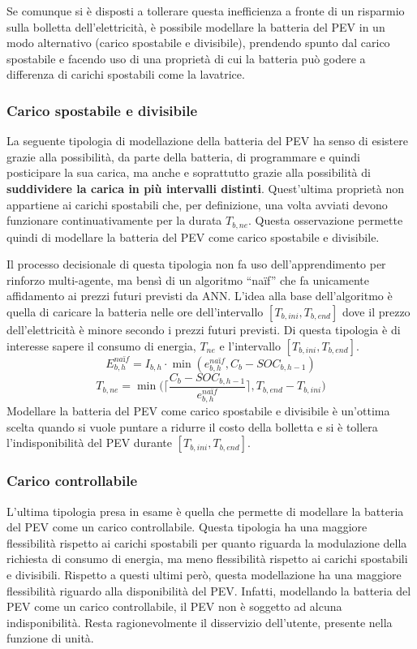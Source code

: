 \documentclass[italian, Lau, oneside]{sapthesis}
\begin{document}
Se comunque si è disposti a tollerare questa inefficienza a fronte di un risparmio sulla bolletta dell'elettricità, è possibile modellare la batteria del PEV in un modo alternativo (carico spostabile e divisibile), prendendo spunto dal carico spostabile e facendo uso di una proprietà di cui la batteria può godere a differenza di carichi spostabili come la lavatrice.

\subsubsection{Carico spostabile e divisibile}
La seguente tipologia di modellazione della batteria del PEV ha senso di esistere grazie alla possibilità, da parte della batteria, di programmare e quindi posticipare la sua carica, ma anche e soprattutto grazie alla possibilità di \textbf{suddividere la carica in più intervalli distinti}. Quest'ultima proprietà non appartiene ai carichi spostabili che, per definizione, una volta avviati devono funzionare continuativamente per la durata $T_{b,ne}$. Questa osservazione permette quindi di modellare la batteria del PEV come carico spostabile e divisibile.

Il processo decisionale di questa tipologia non fa uso dell'apprendimento per rinforzo multi-agente, ma bensì di un algoritmo “naïf” che fa unicamente affidamento ai prezzi futuri previsti da ANN. L'idea alla base dell'algoritmo è quella di caricare la batteria nelle ore dell'intervallo $[T_{b,ini}, T_{b,end}]$ dove il prezzo dell'elettricità è minore secondo i prezzi futuri previsti. Di questa tipologia è di interesse sapere il consumo di energia, $T_{ne}$ e l'intervallo $[T_{b,ini}, T_{b,end}]$.
\begin{equation}
E^{naïf}_{b,h} = I_{b,h} \cdot \min(e^{naïf}_{b,h}, C_b - SOC_{b,h-1})
\end{equation}
\begin{equation}
    T_{b,ne} = \min \Bigg( \Bigg \lceil \frac{C_b - SOC_{b,h-1}}{e^{naïf}_{b,h}} \Bigg \rceil, T_{b,end}-T_{b,ini} \Bigg)
\end{equation}
Modellare la batteria del PEV come carico spostabile e divisibile è un'ottima scelta quando si vuole puntare a ridurre il costo della bolletta e si è tollera l'indisponibilità del PEV durante $[T_{b,ini}, T_{b,end}]$.

\subsubsection{Carico controllabile}
L'ultima tipologia presa in esame è quella che permette di modellare la batteria del PEV come un carico controllabile. Questa tipologia ha una maggiore flessibilità rispetto ai carichi spostabili per quanto riguarda la modulazione della richiesta di consumo di energia, ma meno flessibilità rispetto ai carichi spostabili e divisibili. Rispetto a questi ultimi però, questa modellazione ha una maggiore flessibilità riguardo alla disponibilità del PEV. Infatti, modellando la batteria del PEV come un carico controllabile, il PEV non è soggetto ad alcuna indisponibilità. Resta ragionevolmente il disservizio dell'utente, presente nella funzione di unità.
\end{document}
